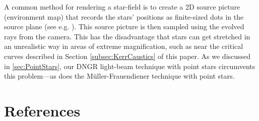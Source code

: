 \documentclass[12pt]{iopart}
\begin{document}
A common method for rendering a star-field is to create a 2D source picture (environment map) that records
the stars' positions as finite-sized dots in the source plane (see e.g. \cite{BOURKE}).
This source picture is then sampled using the evolved rays from the camera. This has the disadvantage that 
stars can get stretched in an unrealistic way in areas of extreme magnification, such as near the
critical curves described in Section \ref{subsec:KerrCaustics} of this paper.  As we discussed in  \ref{sec:PointStars}, our DNGR light-beam technique with point stars circumvents this  problem---as does the M\"uller-Frauendiener technique with point stars.





\section*{References}
\end{document}

